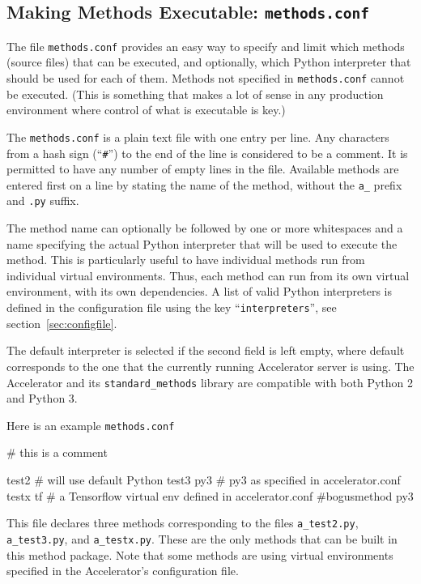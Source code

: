 \subsection{Making Methods Executable:  \texttt{methods.conf}}
\label{sec:methods_conf}
The file \texttt{methods.conf} provides an easy way to specify and
limit which methods (source files) that can be executed, and
optionally, which Python interpreter that should be used for each of
them.  Methods not specified in \texttt{methods.conf} cannot be
executed.  (This is something that makes a lot of sense in any
production environment where control of what is executable is key.)

The \texttt{methods.conf} is a plain text file with one entry per
line.  Any characters from a hash sign (``\texttt{\#}'') to the end of
the line is considered to be a comment.  It is permitted to have any
number of empty lines in the file.  Available methods are entered
first on a line by stating the name of the method, without the
\texttt{a\_} prefix and \texttt{.py} suffix.

The method name can optionally be followed by one or more whitespaces
and a name specifying the actual Python interpreter that will be used
to execute the method.  This is particularly useful to have individual
methods run from individual virtual environments.  Thus, each method
can run from its own virtual environment, with its own dependencies.
A list of valid Python interpreters is defined in the configuration
file using the key ``\texttt{interpreters}'', see
section~\ref{sec:configfile}.

The default interpreter is selected if the second field is left empty,
where default corresponds to the one that the currently running
Accelerator server is using.  The Accelerator and
its \texttt{standard\_methods} library are compatible with both Python
2 and Python 3.

Here is an example \texttt{methods.conf}
\begin{shell}
# this is a comment

test2                # will use default Python
test3           py3  # py3 as specified in accelerator.conf
testx           tf   # a Tensorflow virtual env defined in accelerator.conf
#bogusmethod    py3
\end{shell}
This file declares three methods corresponding to the files
\texttt{a\_test2.py}, \texttt{a\_test3.py}, and \texttt{a\_testx.py}.
These are the only methods that can be built in this method package.
Note that some methods are using virtual environments specified in the
Accelerator's configuration file.



